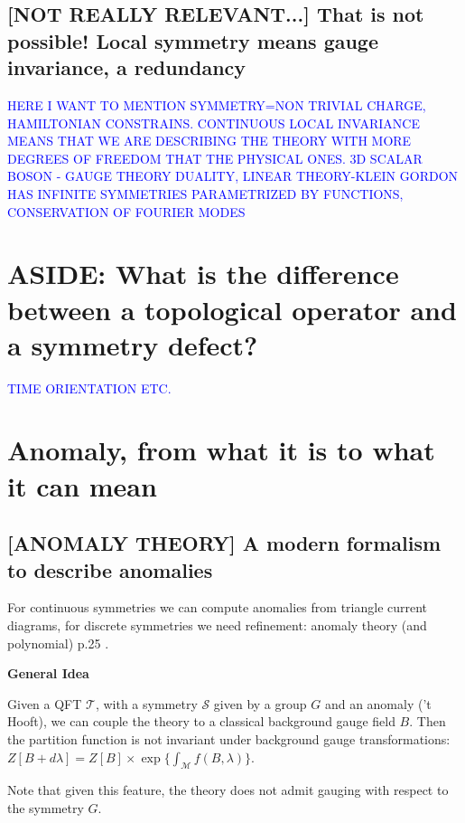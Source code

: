 \documentclass[aps,preprint,nofootinbib,preprintnumbers,eqsecnum,superscriptaddress]{revtex4}
\numberwithin{equation}{section}
\begin{document}
\subsection{[NOT REALLY RELEVANT...] That is not possible! Local symmetry means gauge invariance, a redundancy}

\textcolor{blue}{HERE I WANT TO MENTION SYMMETRY=NON TRIVIAL CHARGE, HAMILTONIAN CONSTRAINS. CONTINUOUS LOCAL INVARIANCE MEANS THAT WE ARE DESCRIBING THE THEORY WITH MORE DEGREES OF FREEDOM THAT THE PHYSICAL ONES. 3D SCALAR BOSON - GAUGE THEORY DUALITY, LINEAR THEORY-KLEIN GORDON HAS INFINITE SYMMETRIES PARAMETRIZED BY FUNCTIONS, CONSERVATION OF FOURIER MODES} \cite{Barcel__2016}

\section{ASIDE: What is the difference between a topological operator and a symmetry defect?}\label{sec:operator_vs_defect}

\textcolor{blue}{TIME ORIENTATION ETC.}

\section{Anomaly, from what it is to what it can mean} \label{sec:anomaly} 

\subsection{[ANOMALY THEORY] A modern formalism to describe anomalies}
For continuous symmetries we can compute anomalies from triangle current diagrams, for discrete symmetries we need refinement: anomaly theory (and polynomial) p.25 \cite{schafernameki_2023}.

\begin{tcolorbox}

{\bf General Idea}

Given a QFT $\mathcal{T}$, with a symmetry $\mathcal{S}$ given by a group $G$ and an anomaly ('t Hooft), we can couple the theory to a classical background gauge field $B$. Then the partition function is not invariant under background gauge transformations: $Z[B+d\lambda]=Z[B]\times \exp \{ \int_\mathcal{M}f(B,\lambda)\}$.

Note that given this feature, the theory does not admit gauging with respect to the symmetry $G$.



\end{tcolorbox} 
\end{document}
